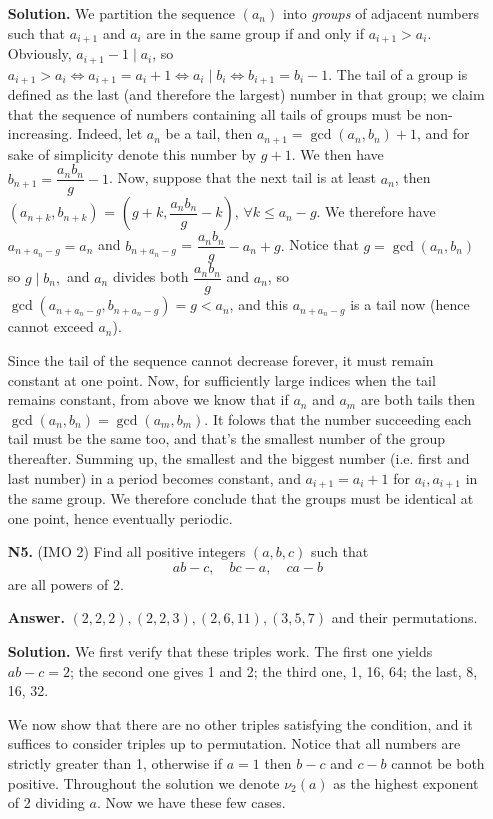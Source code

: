 \documentclass[11pt,a4paper]{article}
\begin{document}
\begin{enumerate}
\textbf{Solution.} We partition the sequence $(a_n)$ into \emph{groups} of adjacent numbers such that $a_{i+1}$ and $a_i$ are in the same group if and only if $a_{i+1}>a_i$. Obviously, $a_{i+1}-1\mid a_i$, so $a_{i+1}>a_i\Leftrightarrow a_{i+1}=a_i +1\Leftrightarrow a_i\mid b_i\Leftrightarrow b_{i+1}=b_{i}-1$. The tail of a group is defined as the last (and therefore the largest) number in that group; we claim that the sequence of numbers containing all tails of groups must be non-increasing. 
Indeed, let $a_n$ be a tail, then $a_{n+1}=\gcd (a_n, b_n)+1$, and for sake of simplicity denote this number by $g+1$. 
We then have $b_{n+1}=\dfrac{a_nb_n}{g}-1$. 
Now, suppose that the next tail is at least $a_n$, then $(a_{n+k}, b_{n+k})$ = $(g+k, \dfrac{a_nb_n}{g}-k)$, $\forall k\le a_n-g$. We therefore have $a_{n+a_n-g}=a_n$ and $b_{n+a_n-g}$ = $\dfrac{a_nb_n}{g}-a_n+g.$ 
Notice that $g=\gcd (a_n, b_n)$ so $g\mid b_n,$ and $a_n$ divides both $\dfrac{a_nb_n}{g}$ and $a_n$, so $\gcd (a_{n+a_n-g}, b_{n+a_n-g})=g<a_n$, and this $a_{n+a_n-g}$ is a tail now (hence cannot exceed $a_n$).

Since the tail of the sequence cannot decrease forever, it must remain constant at one point. 
Now, for sufficiently large indices when the tail remains constant, 
from above we know that if $a_n$ and $a_m$ are both tails then
$\gcd(a_n, b_n)=\gcd(a_m, b_m)$. 
It folows that the number succeeding each tail must be the same too, and that's the smallest number of the group thereafter. Summing up, the smallest and the biggest number (i.e. first and last number) in a period becomes constant, and $a_{i+1}=a_i +1$ for $a_i, a_{i+1}$ in the same group. We therefore conclude that the groups must be identical at one point, hence eventually periodic.

\item[\textbf{N5.}] (IMO 2) Find all positive integers $(a,b,c)$ such that
$$ab-c,\quad bc-a,\quad ca-b$$are all powers of $2$.

\textbf{Answer.} $(2, 2, 2), (2, 2, 3), (2, 6, 11), (3, 5, 7)$ and their permutations. 

\textbf{Solution.} We first verify that these triples work. 
The first one yields $ab-c=2$; the second one gives 1 and 2; the third one, 1, 16, 64; the last, 8, 16, 32. 

We now show that there are no other triples satisfying the condition, 
and it suffices to consider triples up to permutation. 
Notice that all numbers are strictly greater than 1, otherwise if $a=1$ then $b-c$ and $c-b$ cannot be both positive. 
Throughout the solution we denote $\nu_2(a)$ as the highest exponent of 2 dividing $a$. 
Now we have these few cases. 


\end{enumerate}
\end{document}
